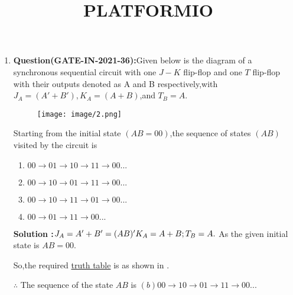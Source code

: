 \documentclass[12pt]{article}
\begin{document}
\title{\textbf{PLATFORMIO}}
\date{}
\maketitle
\begin{enumerate}
    \item \textbf{Question(GATE-IN-2021-36):}Given below  is the diagram of a synchronous sequential circuit with one $J-K$ flip-flop and one $T$ flip-flop with their outputs denoted as A and B respectively,with$J_A = (A'+B'),K_A = (A+B)$,and $T_B = A.$


\begin{figure}[H]
        \centering
	\texttt{[image: image/2.png]}
        \caption{}
        \label{fig:fig:1}
\end{figure}

   
    Starting from the initial state $(AB=00)$,the sequence of states $(AB)$ visited by the circuit is
    \begin{enumerate}
        \item $00\rightarrow01\rightarrow10\rightarrow11\rightarrow00 ...$
        \item $00\rightarrow10\rightarrow01\rightarrow11\rightarrow00 ...$
        \item $00\rightarrow10\rightarrow11\rightarrow01\rightarrow00 ...$
        \item $00\rightarrow01\rightarrow11\rightarrow00 ...$
    \end{enumerate}



    \textbf{Solution :}$J_A = A'+B'= (AB)'\\
    K_A = A+B;\\
    T_B = A.\\$
    As the given initial state is $AB = 00$.

		So,the required \underline{truth table} is as shown in .

   
    \begin{table}[!ht]
        \centering
	    
        \caption{}
        \label{tab:tab:1}
    \end{table}
 $\therefore$ The sequence of the state $AB$ is $(b)00\rightarrow10\rightarrow01\rightarrow11\rightarrow00 ...$
\end{enumerate}
\end{document}
